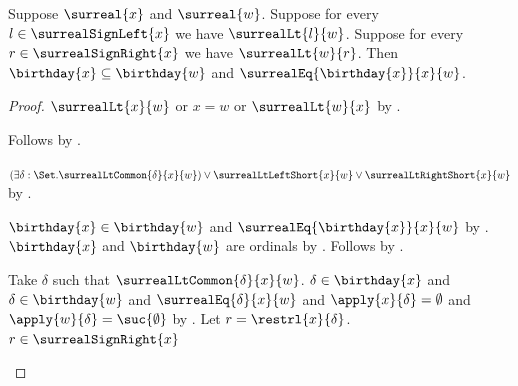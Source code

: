 \begin{lemma}\label{surreal_sign_cut_minimal}
    Suppose $\surreal{x}$ and $\surreal{w}$.
    Suppose for every $l\in\surrealSignLeft{x}$ we have
        $\surrealLt{l}{w}$.
    Suppose for every $r\in\surrealSignRight{x}$ we have
        $\surrealLt{w}{r}$.
    Then $\birthday{x}\subseteq\birthday{w}$ and
        $\surrealEq{\birthday{x}}{x}{w}$.
\end{lemma}
\begin{proof}
    $\surrealLt{x}{w}$ or $x=w$ or $\surrealLt{w}{x}$
        by .
    \begin{byCase}
            Follows by .
            \begin{byCase}
                    $(\exists\delta:\Set.
                            \surrealLtCommon{\delta}{x}{w})
                        \lor\surrealLtLeftShort{x}{w}
                        \lor\surrealLtRightShort{x}{w}$
                        by .
                    \begin{byCase}
                            $\birthday{x}\in\birthday{w}$ and
                                $\surrealEq{\birthday{x}}{x}{w}$
                                by .
                            $\birthday{x}$ and $\birthday{w}$ are ordinals
                                by .
                            Follows by .
                            \begin{byCase}
                                    Take $\delta$ such that
                                        $\surrealLtCommon{\delta}{x}{w}$.
                                    $\delta\in\birthday{x}$ and
                                        $\delta\in\birthday{w}$ and
                                        $\surrealEq{\delta}{x}{w}$ and
                                        $\apply{x}{\delta}=\emptyset$ and
                                        $\apply{w}{\delta}=\suc{\emptyset}$
                                        by .
                                    Let $r=\restrl{x}{\delta}$.
                                    $r\in\surrealSignRight{x}$

\end{byCase}
\end{byCase}
\end{byCase}
\end{byCase}
\end{proof}
